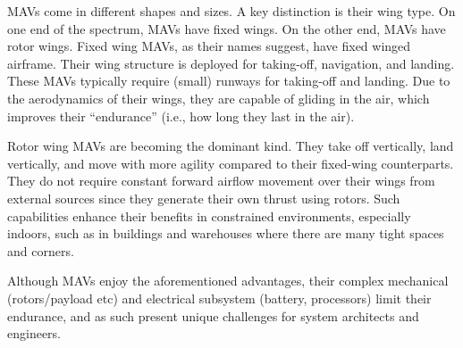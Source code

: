 MAVs come in different shapes and sizes. A key distinction is their wing type. On one end of the spectrum, MAVs have fixed wings. On the other end, MAVs have rotor wings. Fixed wing MAVs, as their names suggest, have fixed winged airframe. Their wing structure is deployed for taking-off, navigation, and landing. These MAVs typically require (small) runways for taking-off and landing. Due to the aerodynamics of their wings, they are capable of gliding in the air, which improves their ``endurance'' (i.e., how long they last in the air).

Rotor wing MAVs are becoming the dominant kind. They take off vertically, land vertically, and move with more agility compared to their fixed-wing counterparts. They do not require constant forward airflow movement over their wings from external sources since they generate their own thrust using rotors. Such capabilities enhance their benefits in constrained environments, especially indoors, such as in buildings and warehouses where there are many tight spaces and corners.

Although MAVs enjoy the aforementioned advantages, their complex mechanical (rotors/payload etc) and electrical subsystem (battery, processors) limit their endurance, and as such present unique challenges for system architects and engineers.

